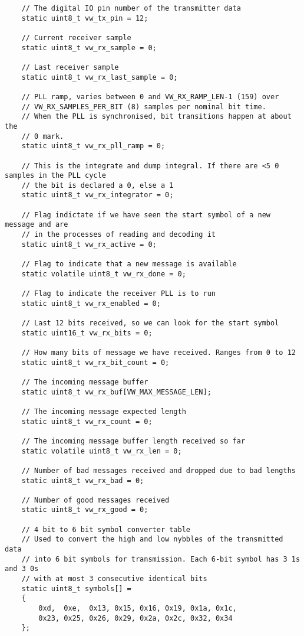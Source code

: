 \begin{verbatim}
    // The digital IO pin number of the transmitter data
    static uint8_t vw_tx_pin = 12;

    // Current receiver sample
    static uint8_t vw_rx_sample = 0;

    // Last receiver sample
    static uint8_t vw_rx_last_sample = 0;

    // PLL ramp, varies between 0 and VW_RX_RAMP_LEN-1 (159) over 
    // VW_RX_SAMPLES_PER_BIT (8) samples per nominal bit time. 
    // When the PLL is synchronised, bit transitions happen at about the
    // 0 mark. 
    static uint8_t vw_rx_pll_ramp = 0;

    // This is the integrate and dump integral. If there are <5 0 samples in the PLL cycle
    // the bit is declared a 0, else a 1
    static uint8_t vw_rx_integrator = 0;

    // Flag indictate if we have seen the start symbol of a new message and are
    // in the processes of reading and decoding it
    static uint8_t vw_rx_active = 0;

    // Flag to indicate that a new message is available
    static volatile uint8_t vw_rx_done = 0;

    // Flag to indicate the receiver PLL is to run
    static uint8_t vw_rx_enabled = 0;

    // Last 12 bits received, so we can look for the start symbol
    static uint16_t vw_rx_bits = 0;

    // How many bits of message we have received. Ranges from 0 to 12
    static uint8_t vw_rx_bit_count = 0;

    // The incoming message buffer
    static uint8_t vw_rx_buf[VW_MAX_MESSAGE_LEN];

    // The incoming message expected length
    static uint8_t vw_rx_count = 0;

    // The incoming message buffer length received so far
    static volatile uint8_t vw_rx_len = 0;

    // Number of bad messages received and dropped due to bad lengths
    static uint8_t vw_rx_bad = 0;

    // Number of good messages received
    static uint8_t vw_rx_good = 0;

    // 4 bit to 6 bit symbol converter table
    // Used to convert the high and low nybbles of the transmitted data
    // into 6 bit symbols for transmission. Each 6-bit symbol has 3 1s and 3 0s 
    // with at most 3 consecutive identical bits
    static uint8_t symbols[] =
    {
        0xd,  0xe,  0x13, 0x15, 0x16, 0x19, 0x1a, 0x1c, 
        0x23, 0x25, 0x26, 0x29, 0x2a, 0x2c, 0x32, 0x34
    };


\end{verbatim}
